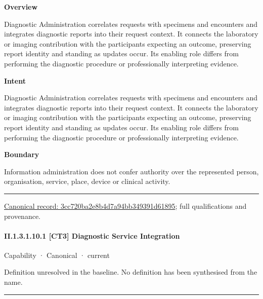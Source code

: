 \textbf{Overview}



Diagnostic Administration correlates requests with specimens and encounters and integrates diagnostic reports into their request context. It connects the laboratory or imaging contribution with the participants expecting an outcome, preserving report identity and standing as updates occur. Its enabling role differs from performing the diagnostic procedure or professionally interpreting evidence.



\textbf{Intent}



Diagnostic Administration correlates requests with specimens and encounters and integrates diagnostic reports into their request context. It connects the laboratory or imaging contribution with the participants expecting an outcome, preserving report identity and standing as updates occur. Its enabling role differs from performing the diagnostic procedure or professionally interpreting evidence.



\textbf{Boundary}



Information administration does not confer authority over the represented person, organisation, service, place, device or clinical activity.



\medskip\hrule\medskip

{\footnotesize \href{../../../../continuum/strategy/capability/3cc720ba2e8b4d7a94bb349391d61895.md}{Canonical record: 3cc720ba2e8b4d7a94bb349391d61895}; full qualifications and provenance.}\par
\paragraph*{II.1.3.1.10.1 [CT3] Diagnostic Service Integration}
\label{navigation:II.1.3.1.10.1}

\label{element:9ded2f3a28d24017bb921a0cdcf65a2b}
{\small Capability · Canonical · current}\par

Definition unresolved in the baseline. No definition has been synthesised from the name.



\medskip\hrule\medskip

